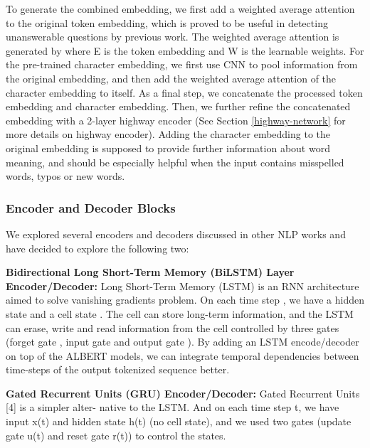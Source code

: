 \documentclass{article}
\begin{document}
To generate the combined embedding, we first add a weighted average attention to the original token embedding, which is proved to be useful in detecting unanswerable questions by previous work. \citep{weighted-average-attention} The weighted average attention is generated by  where E is the token embedding and W is the learnable weights. For the pre-trained character embedding, we first use CNN to pool information from the original embedding, and then add the weighted average attention of the character embedding to itself. As a final step, we concatenate the processed token embedding and character embedding. Then, we further refine the concatenated embedding with a 2-layer highway encoder (See Section \ref{highway-network} for more details on highway encoder). Adding the character embedding to the original embedding is supposed to provide further information about word meaning, and should be especially helpful when the input contains misspelled words, typos or new words.

\subsubsection{Encoder and Decoder Blocks}
We explored several encoders and decoders discussed in other NLP works and have decided to explore the following two:

\textbf{Bidirectional Long Short-Term Memory (BiLSTM) Layer Encoder/Decoder:} Long Short-Term Memory (LSTM) is an RNN architecture aimed to solve vanishing gradients problem. On each time step , we have a hidden state  and a cell state . The cell can store long-term information, and the LSTM can erase, write and read information from the cell controlled by three gates (forget gate , input gate  and output gate ). By adding an LSTM encode/decoder on top of the ALBERT models, we can integrate temporal dependencies between time-steps of the output tokenized sequence better. \citep{lstm}

\textbf{Gated Recurrent Units (GRU) Encoder/Decoder:} Gated Recurrent Units [4] is a simpler alter- native to the LSTM. And on each time step t, we have input x(t) and hidden state h(t) (no cell state), and we used two gates (update gate u(t) and reset gate r(t)) to control the states. \citep{gru}
\end{document}

